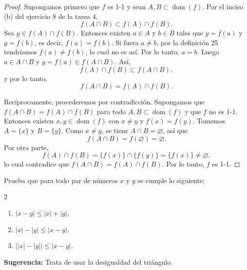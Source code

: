 \documentclass[12pt,a4paper]{article}
\begin{document}
    \begin{proof}
        Supongamos primero que $f$ es 1-1 y sean $A,B\subset\operatorname{dom}(f)$. Por el inciso (b) del ejercicio 8 de la tarea 4,
        \begin{equation*}
            f(A\cap B)\subset f(A)\cap f(B).
        \end{equation*}
        Sea $y\in f(A)\cap f(B)$. Entonces existen $a\in A$ y $b\in B$ tales que $y=f(a)$ y $y=f(b)$, es decir, $f(a)=f(b)$. Si fuera $a\neq b$, por la definición 25 tendríamos $f(a)\neq f(b)$, lo cual no es así. Por lo tanto, $a=b$. Luego $a\in A\cap B$ y $y=f(a)\in f(A\cap B)$. Así,
        \begin{equation*}
            f(A)\cap f(B)\subset f(A\cap B),
        \end{equation*}
        y por lo tanto,
        \begin{equation*}
            f(A\cap B)=f(A)\cap f(B).
        \end{equation*}

        Recíprocamente, procederemos por contradicción. Supongamos que $f(A\cap B)=f(A)\cap f(B)$ para todo $A,B\subset\operatorname{dom}(f)$ y que $f$ no es 1-1. Entonces existen $x,y\in\operatorname{dom}(f)$ con $x\neq y$ y $f(x)=f(y)$. Tomemos $A=\{x\}$ y $B=\{y\}$. Como $x\neq y$, se tiene $A\cap B=\varnothing$, así que
        \begin{equation*}
            f(A\cap B)=f(\varnothing)=\varnothing.
        \end{equation*}
        Por otra parte,
        \begin{equation*}
            f(A)\cap f(B)=\{f(x)\}\cap\{f(y)\}=\{f(x)\}\neq\varnothing,
        \end{equation*}
        lo cual contradice que $f(A\cap B)=f(A)\cap f(B)$. Por lo tanto, $f$ es 1-1.
    \end{proof}

    \begin{problema}
        Prueba que para todo par de números $x$ y $y$ se cumple lo siguiente:
        \begin{multicols}{2}
            \begin{enumerate}
                \item[(a)] $|x-y|\leq|x|+|y|.$
                \item[(b)] $|x|-|y|\leq|x-y|.$
                \item[(c)] $\bigl||x|-|y|\bigr|\leq|x-y|.$
            \end{enumerate}
        \end{multicols}
        \textbf{Sugerencia:} Trata de usar la desigualdad del triángulo.
    \end{problema}
\end{document}
